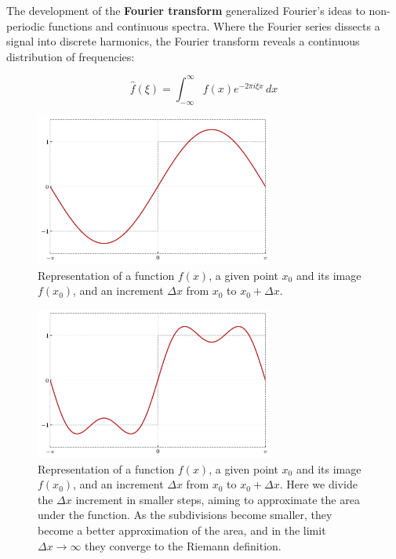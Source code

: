 \documentclass{book}
\begin{document}
The development of the \textbf{Fourier transform} generalized Fourier’s ideas to non-periodic functions and continuous spectra. Where the Fourier series dissects a signal into discrete harmonics, the Fourier transform reveals a continuous distribution of frequencies:

\[
\hat{f}(\xi) = \int_{-\infty}^{\infty} f(x) e^{-2\pi i \xi x} \, dx
\]

\begin{figure}[ht]
    \centering
    \includegraphics[width=0.7\textwidth]{figures/appendix/fourier_series_1.png}
    \caption{Representation of a function $f(x)$, a given point $x_0$ and its image $f(x_0)$, and an increment $\Delta x$ from $x_0$ to $x_0 + \Delta x$.}
    \label{fig:fourier_series_1}
\end{figure}

\begin{figure}[ht]
    \centering
    \includegraphics[width=0.7\textwidth]{figures/appendix/fourier_series_2.png}
    \caption{Representation of a function $f(x)$, a given point $x_0$ and its image $f(x_0)$, and an increment $\Delta x$ from $x_0$ to $x_0 + \Delta x$. Here we divide the $\Delta x$ increment in smaller steps, aiming to approximate the area under the function. As the subdivisions become smaller, they become a better approximation of the area, and in the limit $\Delta x \rightarrow \infty$ they converge to the Riemann definition.}
    \label{fig:fourier_series_2}
\end{figure}
\end{document}
